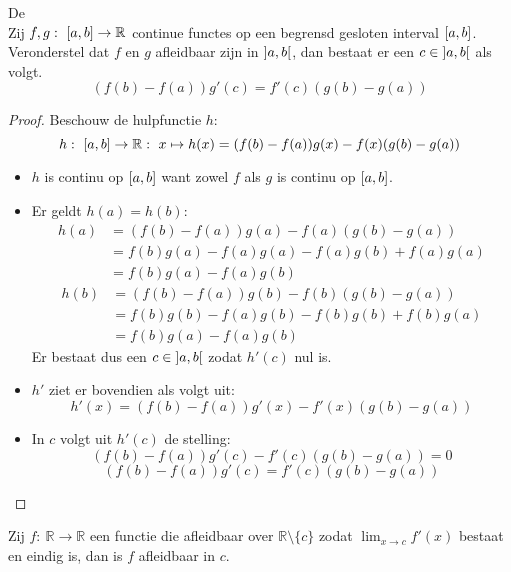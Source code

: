 \documentclass[main.tex]{subfiles}
\begin{document}
\begin{bst}
  \label{st:middelwaardestelling-cauchy}
  De \\
  Zij $f,g:\ \interval{a}{b} \rightarrow \mathbb{R}$ continue functes op een begrensd gesloten interval $\interval{a}{b}$.
  Veronderstel dat $f$ en $g$ afleidbaar zijn in $\interval[open]{a}{b}$, dan bestaat er een $c\in \interval[open]{a}{b}$ als volgt.
  \[ \left( f(b) - f(a) \right) g'(c) = f'(c) \left( g(b) - g(a) \right) \]

  \begin{proof}
    Beschouw de hulpfunctie $h$:
    \[ h:\ \interval{a}{b} \rightarrow \mathbb{R}:\ x \mapsto h(x) = (f(b)-f(a))g(x) -f(x)(g(b)-g(a)) \]
    \begin{itemize}
    \item $h$ is continu op $\interval{a}{b}$ want zowel $f$ als $g$ is continu op $\interval{a}{b}$.
    \item Er geldt $h(a)=h(b)$:
      \[
      \begin{array}{rl}
        h(a) &= (f(b)-f(a))g(a) -f(a)(g(b)-g(a))\\
             &= f(b)g(a)-f(a)g(a)-f(a)g(b)+f(a)g(a)\\
             &= f(b)g(a)-f(a)g(b)
      \end{array}
      \]
      \[
      \begin{array}{rl}
        h(b) &= (f(b)-f(a))g(b) -f(b)(g(b)-g(a))\\
             &= f(b)g(b)-f(a)g(b) -f(b)g(b)+f(b)g(a)\\
             &= f(b)g(a)-f(a)g(b)
      \end{array}
      \]
     Er bestaat dus een $c\in \interval[open]{a}{b}$ zodat $h'(c)$ nul is.
    \item $h'$ ziet er bovendien als volgt uit:
      \[
      h'(x) = (f(b)-f(a))g'(x)-f'(x)(g(b)-g(a))
      \]
   \item In $c$ volgt uit $h'(c)$ de stelling:
     \[
     (f(b)-f(a))g'(c)-f'(c)(g(b)-g(a)) = 0
     \]
     \[
     (f(b)-f(a))g'(c) = f'(c)(g(b)-g(a))
     \]
    \end{itemize}
  \end{proof}
  \feed
\end{bst}

\begin{st}
  Zij $f:\ \mathbb{R} \rightarrow \mathbb{R}$ een functie die afleidbaar over $\mathbb{R} \setminus \{c\}$ zodat $\lim_{x\rightarrow c}f'(x)$ bestaat en eindig is, dan is $f$ afleidbaar in $c$.
\end{st}
\end{document}
